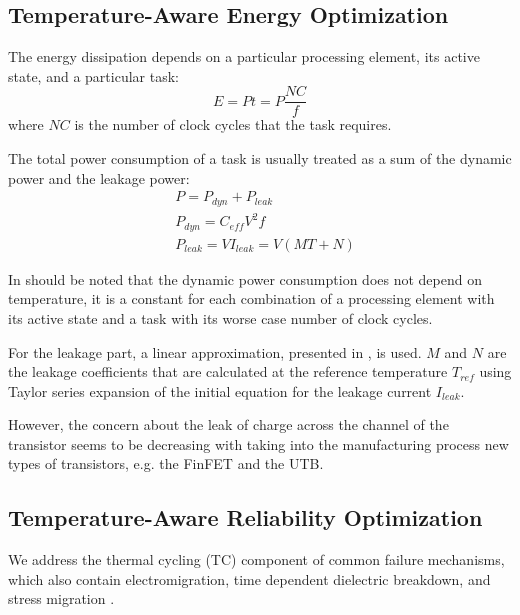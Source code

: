\subsection{Temperature-Aware Energy Optimization}
The energy dissipation depends on a particular processing element, its active state, and a particular task:
\[
  E = P t = P \frac{NC}{f}
\]
where $NC$ is the number of clock cycles that the task requires.

The total power consumption of a task is usually treated as a sum of the dynamic power and the leakage power:
\begin{align*}
  & P = P_{dyn} + P_{leak} \\
  & P_{dyn} = C_{eff} V^2 f \\
  & P_{leak} = V I_{leak} = V (MT + N)
\end{align*}

In should be noted that the dynamic power consumption does not depend on temperature, it is a constant for each combination of a processing element with its active state and a task with its worse case number of clock cycles.

For the leakage part, a linear approximation, presented in \cite{liu2007}, is used. $M$ and $N$ are the leakage coefficients that are calculated at the reference temperature $T_{ref}$ using Taylor series expansion of the initial equation for the leakage current $I_{leak}$.

However, the concern about the leak of charge across the channel of the transistor seems to be decreasing with taking into the manufacturing process new types of transistors, e.g. the FinFET and the UTB.




\subsection{Temperature-Aware Reliability Optimization}
We address the thermal cycling (TC) component of common failure mechanisms, which also contain electromigration, time dependent dielectric breakdown, and stress migration \cite{xiang2010}.

